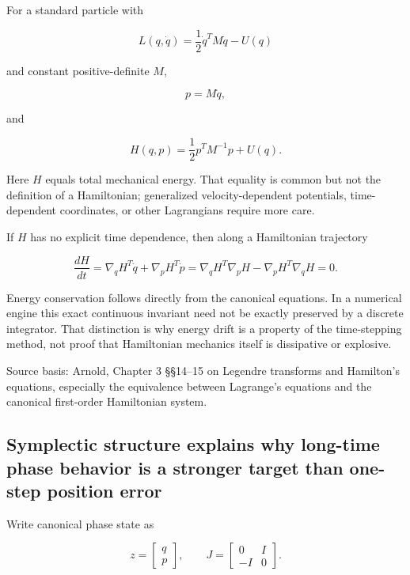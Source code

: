 For a standard particle with

\[
L(q,\dot q)
=
\frac12\dot q^TM\dot q-U(q)
\]

and constant positive-definite \(M\),

\[
p=M\dot q,
\]

and

\[
H(q,p)
=
\frac12p^TM^{-1}p+U(q).
\]

Here \(H\) equals total mechanical energy. That equality is common but not the definition of a Hamiltonian; generalized velocity-dependent potentials, time-dependent coordinates, or other Lagrangians require more care.

If \(H\) has no explicit time dependence, then along a Hamiltonian trajectory

\[
\frac{dH}{dt}
=
\nabla_qH^T\dot q
+
\nabla_pH^T\dot p
=
\nabla_qH^T\nabla_pH
-
\nabla_pH^T\nabla_qH
=
0.
\]

Energy conservation follows directly from the canonical equations. In a numerical engine this exact continuous invariant need not be exactly preserved by a discrete integrator. That distinction is why energy drift is a property of the time-stepping method, not proof that Hamiltonian mechanics itself is dissipative or explosive.

Source basis: Arnold, Chapter 3 §§14--15 on Legendre transforms and Hamilton's equations, especially the equivalence between Lagrange's equations and the canonical first-order Hamiltonian system.

\subsection{Symplectic structure explains why long-time phase behavior is a stronger target than one-step position error}\label{02-foundations-ii-ch039-symplectic-structure-explains-why-long-time-phase-behavior-is-a-stronger-target-than-one-step-position-error}

\hypertarget{02-foundations-ii-ch039-symplectic-structure-explains-why-long-time-phase-behavior-is-a-stronger-target-than-one-step-position-error}{}

Write canonical phase state as

\[
z=
\begin{bmatrix}
q\\p
\end{bmatrix},
\qquad
J=
\begin{bmatrix}
0&I\\
-I&0
\end{bmatrix}.
\]

